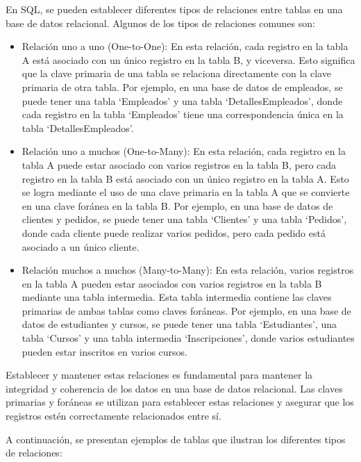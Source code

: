 \documentclass[executivepaper]{article}
\begin{document}
En SQL, se pueden establecer diferentes tipos de relaciones entre tablas en una base de datos relacional. Algunos de los tipos de relaciones comunes son:

\begin{itemize}
\item Relación uno a uno (One-to-One): En esta relación, cada registro en la tabla A está asociado con un único registro en la tabla B, y viceversa. Esto significa que la clave primaria de una tabla se relaciona directamente con la clave primaria de otra tabla. Por ejemplo, en una base de datos de empleados, se puede tener una tabla \enquote*{Empleados} y una tabla \enquote*{DetallesEmpleados}, donde cada registro en la tabla \enquote*{Empleados} tiene una correspondencia única en la tabla \enquote*{DetallesEmpleados}.

\item Relación uno a muchos (One-to-Many): En esta relación, cada registro en la tabla A puede estar asociado con varios registros en la tabla B, pero cada registro en la tabla B está asociado con un único registro en la tabla A. Esto se logra mediante el uso de una clave primaria en la tabla A que se convierte en una clave foránea en la tabla B. Por ejemplo, en una base de datos de clientes y pedidos, se puede tener una tabla \enquote*{Clientes} y una tabla \enquote*{Pedidos}, donde cada cliente puede realizar varios pedidos, pero cada pedido está asociado a un único cliente.

\item Relación muchos a muchos (Many-to-Many): En esta relación, varios registros en la tabla A pueden estar asociados con varios registros en la tabla B mediante una tabla intermedia. Esta tabla intermedia contiene las claves primarias de ambas tablas como claves foráneas. Por ejemplo, en una base de datos de estudiantes y cursos, se puede tener una tabla \enquote*{Estudiantes}, una tabla \enquote*{Cursos} y una tabla intermedia \enquote*{Inscripciones}, donde varios estudiantes pueden estar inscritos en varios cursos.

\end{itemize}

Establecer y mantener estas relaciones es fundamental para mantener la integridad y coherencia de los datos en una base de datos relacional. Las claves primarias y foráneas se utilizan para establecer estas relaciones y asegurar que los registros estén correctamente relacionados entre sí.

A continuación, se presentan ejemplos de tablas que ilustran los diferentes tipos de relaciones:
\end{document}
